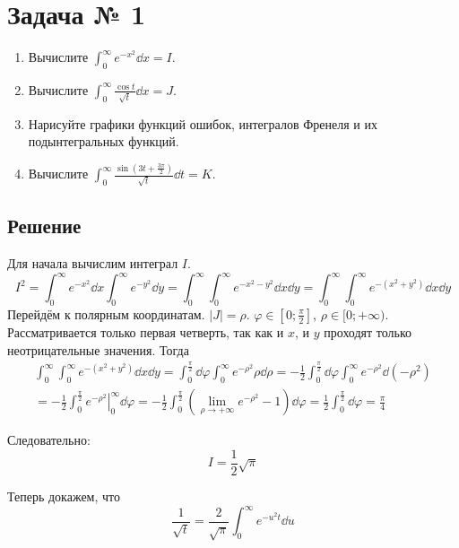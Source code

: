 \section{Задача № 1}

\begin{enumerate}
\item Вычислите \(\int_{0}^{\infty} e^{-x^2} \dd x = I\).
\item Вычислите \(\int_{0}^{\infty} \frac{\cos t}{\sqrt{t}} \dd x = J\).
\item Нарисуйте графики функций ошибок, интегралов Френеля
  и их подынтегральных функций.
\item Вычислите
  \(\int_{0}^{\infty} \frac{\sin(3t + \frac{3\pi}{2})}{\sqrt{t}} \dd t = K\).
\end{enumerate}

\subsection{Решение}

Для начала вычислим интеграл \(I\).
\[
  I^2 = \int_{0}^{\infty} e^{-x^2} \dd x \int_{0}^{\infty} e^{-y^2} \dd y
  = \int_{0}^{\infty} \int_{0}^{\infty} e^{-x^2-y^2} \dd x \dd y
  = \int_{0}^{\infty} \int_{0}^{\infty} e^{-(x^2+y^2)} \dd x \dd y
\]
Перейдём к полярным координатам. \(|J| = \rho\).
\(\varphi \in [0; \frac{\pi}{2}]\), \(\rho \in [0;+\infty)\).
Рассматривается только первая четверть, так как и \(x\), и \(y\)
проходят только неотрицательные значения.
Тогда
\[
\begin{split}
  \int_{0}^{\infty} \int_{0}^{\infty} e^{-(x^2+y^2)} \dd x \dd y
  = \int_{0}^{\frac{\pi}{2}} \dd \varphi \int_{0}^{\infty} e^{-\rho^2} \rho \dd \rho
  = -\frac{1}{2} \int_{0}^{\frac{\pi}{2}} \dd \varphi \int_{0}^{\infty} e^{-\rho^2} \dd(-\rho^2) \\
  = -\frac{1}{2} \int_{0}^{\frac{\pi}{2}} \left. e^{-\rho^2}\right\rvert_{0}^{\infty}\dd \varphi
  = -\frac{1}{2} \int_{0}^{\frac{\pi}{2}}
    \left( \lim_{\rho \to +\infty} e^{-\rho^2} - 1 \right) \dd \varphi
  = \frac{1}{2} \int_{0}^{\frac{\pi}{2}} \dd \varphi
  = \frac{\pi}{4}
\end{split}
\]

Следовательно:
\[ I = \frac{1}{2}\sqrt{\pi} \]

Теперь докажем, что
\begin{equation}\label{eq:01-sqrtt}
  \frac{1}{\sqrt{t}} = \frac{2}{\sqrt{\pi}} \int_{0}^{\infty} e^{-u^2 t} \dd u
\end{equation}

